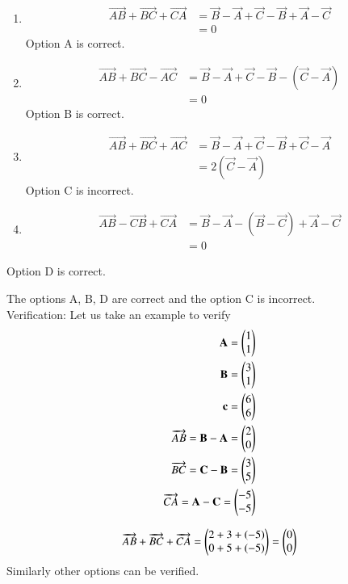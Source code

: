 \documentclass[journal,12pt,twocolumn]{IEEEtran}
\begin{document}
\begin{enumerate}
\begin{enumerate}
\item 
\begin{align}
\overrightarrow{AB}+\overrightarrow{BC}+\overrightarrow{CA} &=
\vec{B}-\vec{A} + \vec{C} - \vec{B} + \vec{A} - \vec{C}\\
 &= 0
\end{align}
Option A is correct.

\item
\begin{align}
\overrightarrow{AB}+\overrightarrow{BC}-\overrightarrow{AC} &=
\vec{B}-\vec{A} + \vec{C} - \vec{B} - (\vec{C} - \vec{A})\\
 &= 0
\end{align}
Option B is correct.

\item 
\begin{align}
\overrightarrow{AB}+\overrightarrow{BC}+\overrightarrow{AC} &=
\vec{B}-\vec{A} + \vec{C} - \vec{B} + \vec{C} - \vec{A}\\
 &= 2(\vec{C}-\vec{A})
\end{align}
Option C is incorrect.

\item
\begin{align}
\overrightarrow{AB}-\overrightarrow{CB}+\overrightarrow{CA} &=
\vec{B}-\vec{A} - (\vec{B} - \vec{C}) + \vec{A} - \vec{C}\\
 &= 0
\end{align}
\end{enumerate}
Option D is correct.

The options A, B, D are correct and the option C is incorrect.\\

Verification: Let us take an example to verify 
\begin{align}
\mathbf{A} = \begin{pmatrix}1\\1\end{pmatrix} \\
\mathbf{B} = \begin{pmatrix}3\\1\end{pmatrix} \\
\mathbf{c} = \begin{pmatrix}6\\6\end{pmatrix} \\
\overrightarrow{AB} = \mathbf{B} - \mathbf{A} = \begin{pmatrix}2\\0\end{pmatrix} \\
\overrightarrow{BC} = \mathbf{C} - \mathbf{B} = \begin{pmatrix}3\\5\end{pmatrix} \\
\overrightarrow{CA} = \mathbf{A} - \mathbf{C} = \begin{pmatrix}-5\\-5\end{pmatrix} 
\end{align}

\begin{align}
\overrightarrow{AB}+\overrightarrow{BC}+\overrightarrow{CA} = \begin{pmatrix}2+3+(-5) \\ 0+5+(-5)\end{pmatrix} = \begin{pmatrix}0 \\0\end{pmatrix}
\end{align}
Similarly other options can be verified.

\end{enumerate}
\end{document}
